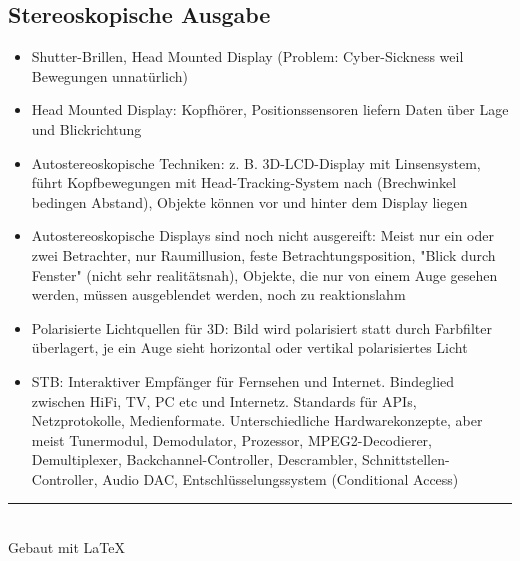 \documentclass[12pt,landscape]{article}
\begin{document}
\begin{multicols}{3}
\subsection{Stereoskopische Ausgabe}
\begin{itemize}
\item Shutter-Brillen, Head Mounted Display (Problem: Cyber-Sickness weil Bewegungen unnatürlich)
\item Head Mounted Display: Kopfhörer, Positionssensoren liefern Daten über Lage und Blickrichtung
\item Autostereoskopische Techniken: z. B. 3D-LCD-Display mit Linsensystem, führt Kopfbewegungen mit Head-Tracking-System nach (Brechwinkel bedingen Abstand), Objekte können vor und hinter dem Display liegen
\item Autostereoskopische Displays sind noch nicht ausgereift: Meist nur ein oder zwei Betrachter, nur Raumillusion, feste Betrachtungsposition, "Blick durch Fenster" (nicht sehr realitätsnah), Objekte, die nur von einem Auge gesehen werden, müssen ausgeblendet werden, noch zu reaktionslahm
\item Polarisierte Lichtquellen für 3D: Bild wird polarisiert statt durch Farbfilter überlagert, je ein Auge sieht horizontal oder vertikal polarisiertes Licht
\item STB: Interaktiver Empfänger für Fernsehen und Internet. Bindeglied zwischen HiFi, TV, PC etc und Internetz. Standards für APIs, Netzprotokolle, Medienformate. Unterschiedliche Hardwarekonzepte, aber meist Tunermodul, Demodulator, Prozessor, MPEG2-Decodierer, Demultiplexer, Backchannel-Controller, Descrambler, Schnittstellen-Controller, Audio DAC, Entschlüsselungssystem (Conditional Access)
\end{itemize}
\rule{0.3\linewidth}{0.25pt}
\scriptsize \\
Gebaut mit \LaTeX
\end{multicols}
\end{document}
